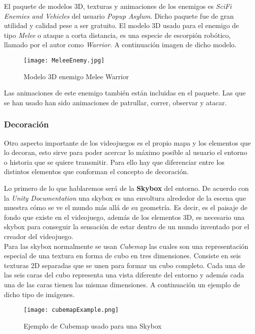 El paquete de modelos 3D, texturas y animaciones de los enemigos es \textit{SciFi Enemies and Vehicles} del usuario \textit{Popup Asylum}. Dicho paquete fue de gran utilidad y calidad pese a ser gratuito. El modelo 3D usado para el enemigo de tipo \textit{Melee} o ataque a corta distancia, es una especie de escorpión robótico, llamado por el autor como \textit{Warrior}. A continuación imagen de dicho modelo.

\begin{figure}[H]
    \centering
    \texttt{[image: MeleeEnemy.jpg]}
    \caption{Modelo 3D enemigo Melee Warrior}
\end{figure}

Las animaciones de este enemigo también están incluidas en el paquete. Las que se han usado han sido animaciones de patrullar, correr, observar y atacar.

\subsubsection{Decoración}

Otro aspecto importante de los videojuegos es el propio mapa y los elementos que lo decoran, esto sirve para poder acercar lo máximo posible al usuario 
el entorno o historia que se quiere transmitir. Para ello hay que diferenciar entre los distintos elementos que conforman el concepto de decoración.

Lo primero de lo que hablaremos será de la \textbf{Skybox} del entorno. De acuerdo con la \textit{Unity Documentation} una skybox es una envoltura alrededor de la escena que muestra cómo se ve el mundo más allá de su geometría. Es decir, es el paisaje de fondo que existe en el videojuego, además de los elementos 3D, es necesario una skybox para conseguir la sensación de estar dentro de un mundo inventado por el creador del videojuego.\\

Para las skybox normalmente se usan  \textit{Cubemap} \cite{Cubemaps} las cuales son una representación especial de una textura en forma de cubo en tres dimensiones. Consiste en seis texturas 2D separadas que se unen para formar un cubo completo. Cada una de las seis caras del cubo representa una vista diferente del entorno y además cada una de las caras tienen las mismas dimensiones. A continuación un ejemplo de dicho tipo de imágenes.\\

\begin{figure}[H]
    \centering
    \texttt{[image: cubemapExample.png]}
    \caption{Ejemplo de Cubemap usado para una Skybox}
\end{figure}

